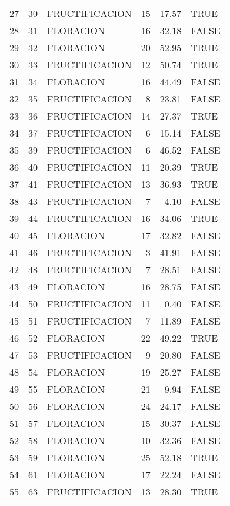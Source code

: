 \begin{table}[ht]
\begin{tabular}{rllrrl}
  27 & 30 & FRUCTIFICACION &  15 & 17.57 & TRUE \\ 
  28 & 31 & FLORACION &  16 & 32.18 & FALSE \\ 
  29 & 32 & FLORACION &  20 & 52.95 & TRUE \\ 
  30 & 33 & FRUCTIFICACION &  12 & 50.74 & TRUE \\ 
  31 & 34 & FLORACION &  16 & 44.49 & FALSE \\ 
  32 & 35 & FRUCTIFICACION &   8 & 23.81 & FALSE \\ 
  33 & 36 & FRUCTIFICACION &  14 & 27.37 & TRUE \\ 
  34 & 37 & FRUCTIFICACION &   6 & 15.14 & FALSE \\ 
  35 & 39 & FRUCTIFICACION &   6 & 46.52 & FALSE \\ 
  36 & 40 & FRUCTIFICACION &  11 & 20.39 & TRUE \\ 
  37 & 41 & FRUCTIFICACION &  13 & 36.93 & TRUE \\ 
  38 & 43 & FRUCTIFICACION &   7 & 4.10 & FALSE \\ 
  39 & 44 & FRUCTIFICACION &  16 & 34.06 & TRUE \\ 
  40 & 45 & FLORACION &  17 & 32.82 & FALSE \\ 
  41 & 46 & FRUCTIFICACION &   3 & 41.91 & FALSE \\ 
  42 & 48 & FRUCTIFICACION &   7 & 28.51 & FALSE \\ 
  43 & 49 & FLORACION &  16 & 28.75 & FALSE \\ 
  44 & 50 & FRUCTIFICACION &  11 & 0.40 & FALSE \\ 
  45 & 51 & FRUCTIFICACION &   7 & 11.89 & FALSE \\ 
  46 & 52 & FLORACION &  22 & 49.22 & TRUE \\ 
  47 & 53 & FRUCTIFICACION &   9 & 20.80 & FALSE \\ 
  48 & 54 & FLORACION &  19 & 25.27 & FALSE \\ 
  49 & 55 & FLORACION &  21 & 9.94 & FALSE \\ 
  50 & 56 & FLORACION &  24 & 24.17 & FALSE \\ 
  51 & 57 & FLORACION &  15 & 30.37 & FALSE \\ 
  52 & 58 & FLORACION &  10 & 32.36 & FALSE \\ 
  53 & 59 & FLORACION &  25 & 52.18 & TRUE \\ 
  54 & 61 & FLORACION &  17 & 22.24 & FALSE \\ 
  55 & 63 & FRUCTIFICACION &  13 & 28.30 & TRUE \\ 

\end{tabular}
\end{table}
